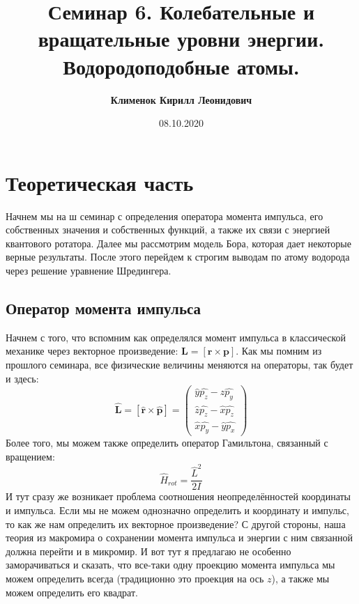 \documentclass[12pt]{article}
\begin{document}
 
\title{\textbf{Семинар 6. Колебательные и вращательные уровни энергии. Водородоподобные атомы.}}
\author{\textbf{Клименок Кирилл Леонидович}}
\date{08.10.2020}
\maketitle
\section{Теоретическая часть}
Начнем мы на ш семинар с определения оператора момента импульса, его собственных значения и собственных функций,  а также их связи с энергией квантового ротатора. Далее мы рассмотрим модель Бора, которая дает некоторые верные результаты. После этого перейдем к строгим выводам по атому водорода через решение уравнение Шредингера. 
\subsection{Оператор момента импульса}
Начнем с того, что вспомним как определялся момент импульса в классической механике через векторное произведение: $\textbf{L} = [\textbf{r} \times \textbf{p}]$. Как мы помним из прошлого семинара, все физические величины меняются на операторы, так будет и здесь:
\begin{equation}
    \hat{\textbf{L}} = [\hat{\textbf{r}}\times \hat{\textbf{p}}] = \left(\begin{array}{c}
        \hat{y}\hat{p_z} - \hat{z}\hat{p_y}\\
        \hat{z}\hat{p_z} - \hat{x}\hat{p_z}\\
        \hat{x}\hat{p_y} - \hat{y}\hat{p_x} 
    \end{array}\right)
\end{equation}
Более того, мы можем также определить оператор Гамильтона, связанный с вращением:
\begin{equation}
    \hat{H}_{rot} = \dfrac{\hat{L}^2}{2I}
\end{equation}
И тут сразу же возникает проблема соотношения неопределённостей координаты и импульса. Если мы не можем однозначно определить и координату и импульс, то как же нам определить их векторное произведение? С другой стороны, наша теория из макромира о сохранении момента импульса и энергии с ним связанной должна перейти и в микромир. И вот тут я предлагаю не особенно заморачиваться и сказать, что все-таки одну проекцию момента импульса мы можем определить всегда (традиционно это проекция на ось $z$), а также мы можем определить его квадрат.
\end{document}
